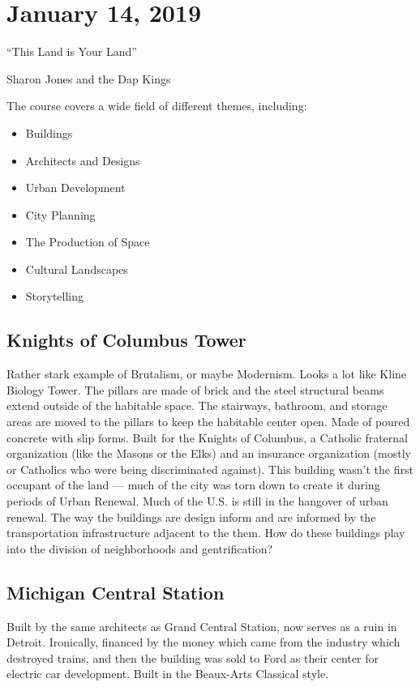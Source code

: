 
\section{January 14, 2019}

\epigraph{``This Land is Your Land''}{Sharon Jones and the Dap Kings}

The course covers a wide field of different themes, including:

\begin{multicols}{2}
\begin{itemize}
\item Buildings
\item Architects and Designs
\item Urban Development
\item City Planning
\item The Production of Space
\item Cultural Landscapes
\item Storytelling
\end{itemize}
\end{multicols}

\subsection*{Knights of Columbus Tower}

Rather stark example of Brutalism, or maybe Modernism. Looks a lot like Kline Biology Tower. The pillars are made of brick and the steel structural beams extend outside of the habitable space. The stairways, bathroom, and storage areas are moved to the pillars to keep the habitable center open. Made of poured concrete with slip forms. Built for the Knights of Columbus, a Catholic fraternal organization (like the Masons or the Elks) and an insurance organization (mostly or Catholics who were being discriminated against). This building wasn't the first occupant of the land --- much of the city was torn down to create it during periods of Urban Renewal. Much of the U.S. is still in the hangover of urban renewal. The way the buildings are design inform and are informed by the transportation infrastructure adjacent to the them. How do these buildings play into the division of neighborhoods and gentrification?

\subsection*{Michigan Central Station}
Built by the same architects as Grand Central Station, now serves as a ruin in Detroit. Ironically, financed by the money which came from the industry which destroyed trains, and then the building was sold to Ford as their center for electric car development. Built in the Beaux-Arts Classical style.

